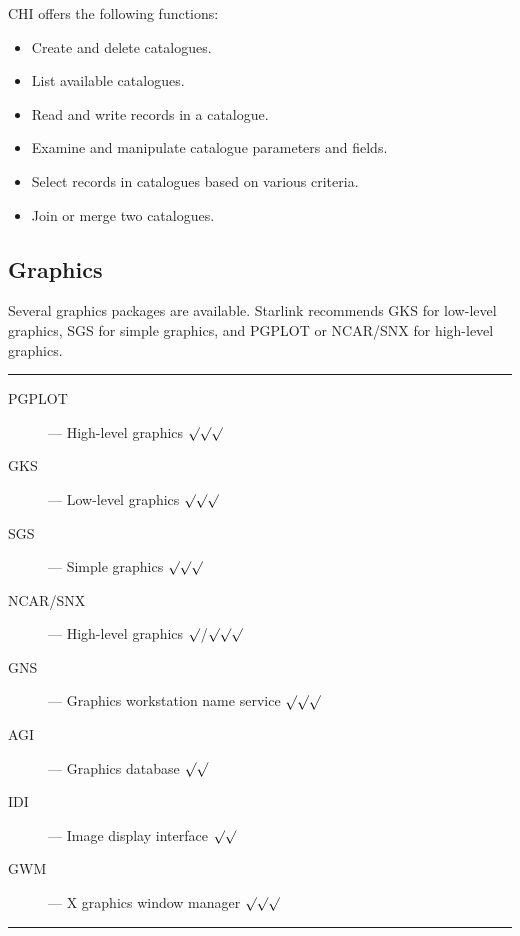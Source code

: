 \begin{description}
CHI offers the following functions:
\begin{itemize}
\item Create and delete catalogues.
\item List available catalogues.
\item Read and write records in a catalogue.
\item Examine and manipulate catalogue parameters and fields.
\item Select records in catalogues based on various criteria.
\item Join or merge two catalogues.
\end{itemize}

\end{description}

\newpage

\subsection{Graphics}

Several graphics packages are available.
Starlink recommends GKS for low-level graphics, SGS for simple graphics, and
PGPLOT or NCAR/SNX for high-level graphics.

\rule{\textwidth}{0.5mm}
\begin{description}
\begin{description}
\item [PGPLOT] --- High-level graphics \hfill $\surd\surd\surd$
\item [GKS] --- Low-level graphics \hfill $\surd\surd\surd$
\item [SGS] --- Simple graphics \hfill $\surd\surd\surd$
\item [NCAR/SNX] --- High-level graphics \hfill $\surd$/$\surd\surd\surd$
\item [GNS] --- Graphics workstation name service \hfill $\surd\surd\surd$
\item [AGI] ---  Graphics database \hfill $\surd\surd$
\item [IDI] --- Image display interface \hfill $\surd\surd$
\item [GWM] --- X graphics window manager \hfill $\surd\surd\surd$
\end{description}
\end{description}
\rule{\textwidth}{0.5mm}

